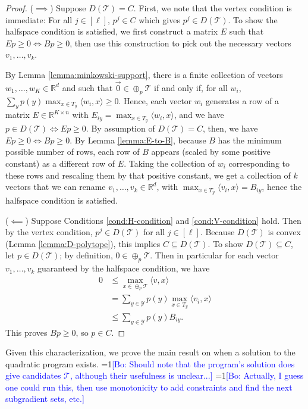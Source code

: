\documentclass[anon]{colt2020} %
\newcommand{\Comments}{1}
\newcommand{\mynote}[2]{\ifnum\Comments=1\textcolor{#1}{#2}\fi}
\newcommand{\bo}[1]{\mynote{blue}{[Bo: #1]}}
\newcommand{\reals}{\mathbb{R}}
\newcommand{\T}{\mathcal{T}}
\newcommand{\Y}{\mathcal{Y}}
\newcommand{\inprod}[2]{\langle #1, #2 \rangle}%
\begin{document}
\begin{proof}
  ($\implies$)
  Suppose $D(\T) = C$.
  First, we note that the vertex condition is immediate: For all $j \in [\ell]$, $p^j \in C$ which gives $p^j \in D(\T)$.
  To show the halfspace condition is satisfied, we first construct a matrix $E$ such that $Ep \geq 0 \iff Bp \geq 0$, then use this construction to pick out the necessary vectors $v_1,\dots,v_k$.

  By Lemma \ref{lemma:minkowski-support}, there is a finite collection of vectors $w_1,\dots,w_{K} \in \reals^d$ and such that $\vec 0 \in \oplus_p \T$ if and only if, for all $w_i$, $\sum_y p(y) \max_{x \in T_y} \inprod{w_i}{x} \geq 0$.
  Hence, each vector $w_i$ generates a row of a matrix $E \in \reals^{K \times n}$ with $E_{iy} = \max_{x \in T_y} \inprod{w_i}{x}$, and we have $p \in D(\T) \iff Ep \geq 0$.
  By assumption of $D(\T) = C$, then, we have $Ep \geq 0 \iff Bp \geq 0$.
  By Lemma \ref{lemma:E-to-B}, because $B$ has the minimum possible number of rows, each row of $B$ appears (scaled by some positive constant) as a different row of $E$. Taking the collection of $w_i$ corresponding to these rows and rescaling them by that positive constant, we get a collection of $k$ vectors that we can rename $v_1,\ldots,v_k \in \reals^d$, with $\max_{x \in T_y} \inprod{v_i}{x} = B_{iy}$, hence the halfspace condition is satisfied.

  ($\impliedby$)
  Suppose Conditions \ref{cond:H-condition} and \ref{cond:V-condition} hold.
  Then by the vertex condition, $p^j \in D(\T)$ for all $j \in [\ell]$.
  Because $D(\T)$ is convex (Lemma \ref{lemma:D-polytope}), this implies $C \subseteq D(\T)$.
  To show $D(\T) \subseteq C$, let $p \in D(\T)$; by definition, $0 \in \oplus_p \T$.
  Then in particular for each vector $v_1,\ldots,v_k$ guaranteed by the halfspace condition, we have
  \begin{align*}
    0 &\leq \max_{x \in \oplus_p \T} \inprod{v}{x}  \\
      &=    \sum_{y \in \Y} p(y) \max_{x \in T_y} \inprod{v_i}{x}  \\
      &\leq \sum_{y \in \Y} p(y) B_{iy} .
  \end{align*}
  This proves $Bp \geq 0$, so $p \in C$.
\end{proof}

Given this characterization, we prove the main result on when a solution to the quadratic program exists.
\bo{Should note that the program's solution does give candidates $\T$, although their usefulness is unclear...}
\bo{Actually, I guess one could run this, then use monotonicity to add constraints and find the next subgradient sets, etc.}
\end{document}
